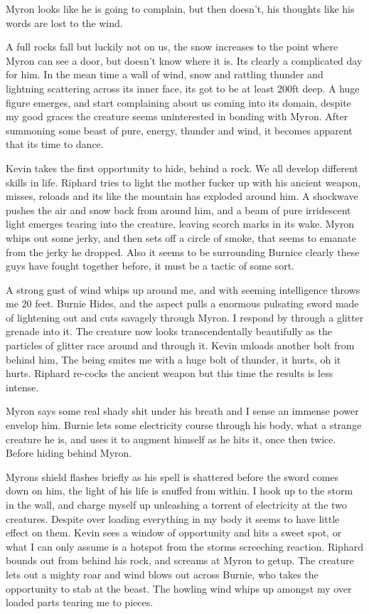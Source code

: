 Myron looks like he is going to complain, but then doesn't, his thoughts like his words are lost to the wind.\medskip

A full rocks fall but luckily not on us, the snow increases to the point where Myron can see a door, but doesn't know where it is. Its clearly a complicated day for him. In the mean time a wall of wind, snow and rattling thunder and lightning scattering across its inner face, its got to be at least 200ft deep. A huge figure emerges, and start complaining about us coming into its domain, despite my good graces the creature seems uninterested in bonding with Myron. After summoning some beast of pure, energy, thunder and wind, it becomes apparent that its time to dance.\medskip

Kevin takes the first opportunity to hide, behind a rock. We all develop different skills in life. Riphard tries to light the mother fucker up with his ancient weapon, misses, reloads and its like the mountain has exploded around him. A shockwave pushes the air and snow back from around him, and a beam of pure irridescent light emerges tearing into the creature, leaving scorch marks in its wake. Myron whips out some jerky, and then sets off a circle of smoke, that seems to emanate from the jerky he dropped. Also it seems to be surrounding Burnice clearly these guys have fought together before, it must be a tactic of some sort.\medskip

A strong gust of wind whips up around me, and with seeming intelligence throws me 20 feet. Burnie Hides, and the aspect pulls a enormous pulsating sword made of lightening out and cuts savagely through Myron. I respond by through a glitter grenade into it. The creature now looks transcendentally beautifully as the particles of glitter race around and through it. Kevin unloads another bolt from behind him, The being smites me with a huge bolt of thunder, it hurts, oh it hurts. Riphard re-cocks the ancient weapon but this time the results is less intense.\medskip

Myron says some real shady shit under his breath and I sense an immense power envelop him. Burnie lets some electricity course through his body, what a strange creature he is, and uses it to augment himself as he hits it, once then twice. Before hiding behind Myron.\medskip

Myrons shield flashes briefly as his spell is shattered before the sword comes down on him, the light of his life is snuffed from within. I hook up to the storm in the wall, and charge myself up unleashing a torrent of electricity at the two creatures. Despite over loading everything in my body it seems to have little effect on them. Kevin sees a window of opportunity and hits a sweet spot, or what I can only assume is a hotspot from the storms screeching reaction. Riphard bounds out from behind his rock, and screams at Myron to getup. The creature lets out a mighty roar and wind blows out across Burnie, who takes the opportunity to stab at the beast. The howling wind whips up amongst my over loaded parts tearing me to pieces.\medskip


